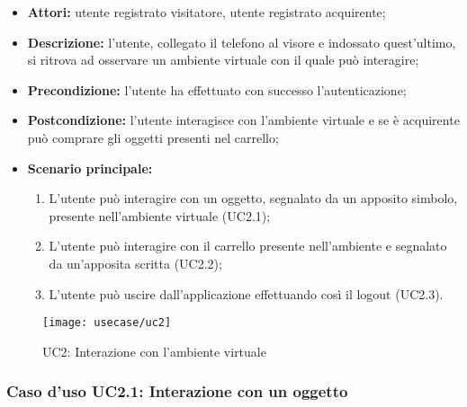 \begin{itemize}
	\item \textbf{Attori:} utente registrato visitatore, utente registrato acquirente;
	\item \textbf{Descrizione:} l'utente, collegato il telefono al visore e indossato quest'ultimo, si ritrova ad osservare un ambiente virtuale con il quale può interagire;
	\item \textbf{Precondizione:} l'utente ha effettuato con successo l'autenticazione;
	\item \textbf{Postcondizione:} l'utente interagisce con l'ambiente virtuale e se è acquirente può comprare gli oggetti presenti nel carrello;
	\item \textbf{Scenario principale:}
	\begin{enumerate}
		\item L'utente può interagire con un oggetto, segnalato da un apposito simbolo, presente nell'ambiente virtuale (UC2.1);
		\item L'utente può interagire con il carrello presente nell'ambiente e segnalato da un'apposita scritta (UC2.2);
		\item L'utente può uscire dall'applicazione effettuando così il logout (UC2.3).
	\end{enumerate}
\end{itemize}

\label{UC2}
\begin{figure}[ht]
	\begin{center}
		\texttt{[image: usecase/uc2]}
		\caption{UC2: Interazione con l'ambiente virtuale}
	\end{center}
\end{figure}
\FloatBarrier

\subsubsection{Caso d'uso UC2.1: Interazione con un oggetto}

